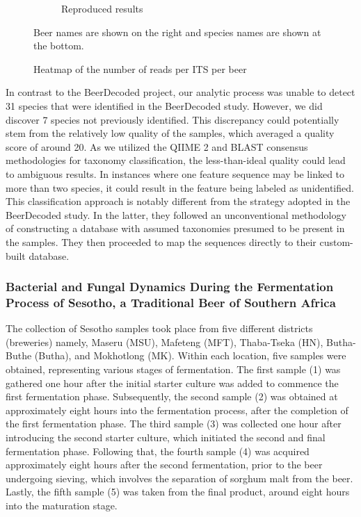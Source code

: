 \begin{figure}[H]
\begin{subfigure}[b]{0.6\textwidth}
            \caption{Reproduced results}
            \label{fig:results:reproduced_BeerDecoded_heatmap}
        \end{subfigure}
        \caption{Heatmap of the number of reads per ITS per beer}
        \small Beer names are shown on the right and species names are shown at the bottom.
        \label{fig:results:BeerDecoded_heatmap}
    \end{figure}
    
    In contrast to the BeerDecoded project, our analytic process was unable to detect 31 species that were identified in the BeerDecoded study. However, we did discover 7 species not previously identified. This discrepancy could potentially stem from the relatively low quality of the samples, which averaged a quality score of around 20. As we utilized the QIIME 2 and BLAST consensus methodologies for taxonomy classification, the less-than-ideal quality could lead to ambiguous results. In instances where one feature sequence may be linked to more than two species, it could result in the feature being labeled as unidentified. This classification approach is notably different from the strategy adopted in the BeerDecoded study. In the latter, they followed an unconventional methodology of constructing a database with assumed taxonomies presumed to be present in the samples. They then proceeded to map the sequences directly to their custom-built database.

\subsubsection{Bacterial and Fungal Dynamics During the Fermentation Process of Sesotho, a Traditional Beer of Southern Africa}



     The collection of Sesotho samples took place from five different districts (breweries) namely, Maseru (MSU), Mafeteng (MFT), Thaba-Tseka (HN), Butha-Buthe (Butha), and Mokhotlong (MK). Within each location, five samples were obtained, representing various stages of fermentation. The first sample (1) was gathered one hour after the initial starter culture was added to commence the first fermentation phase. Subsequently, the second sample (2) was obtained at approximately eight hours into the fermentation process, after the completion of the first fermentation phase. The third sample (3) was collected one hour after introducing the second starter culture, which initiated the second and final fermentation phase. Following that, the fourth sample (4) was acquired approximately eight hours after the second fermentation, prior to the beer undergoing sieving, which involves the separation of sorghum malt from the beer. Lastly, the fifth sample (5) was taken from the final product, around eight hours into the maturation stage.
    
